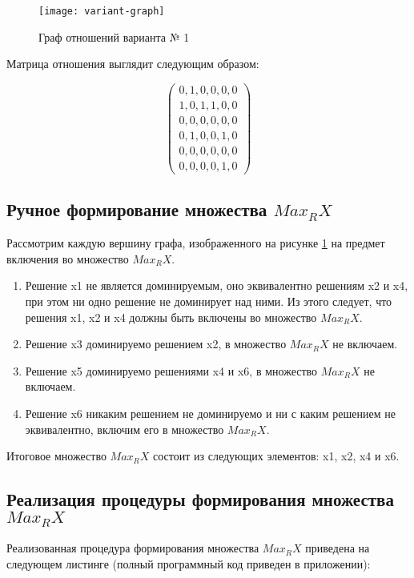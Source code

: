 \documentclass[a4paper,14pt]{extarticle}
\begin{document}
\begin{figure}[H]
    \centering
    \texttt{[image: variant-graph]}
    \caption{Граф отношений варианта № 1}
    \label{fig:variant-graph}
\end{figure}

Матрица отношения выглядит следующим образом:

$$\begin{pmatrix}
    0, 1, 0, 0, 0, 0 \\
    1, 0, 1, 1, 0, 0 \\
    0, 0, 0, 0, 0, 0 \\
    0, 1, 0, 0, 1, 0 \\
    0, 0, 0, 0, 0, 0 \\
    0, 0, 0, 0, 1, 0
\end{pmatrix}$$

\subsection{Ручное формирование множества $Max_R X$}
Рассмотрим каждую вершину графа, изображенного на рисунке
\ref{fig:variant-graph} на предмет включения во множество $Max_R X$.

\begin{enumerate}
    \item Решение x1 не является доминируемым, оно эквивалентно решениям x2 и
          x4, при этом ни одно решение не доминирует над ними. Из этого следует,
          что решения x1, x2 и x4 должны быть включены во множество $Max_R X$.

    \item Решение x3 доминируемо решением x2, в множество $Max_R X$ не включаем.
    
    \item Решение x5 доминируемо решениями x4 и x6, в множество $Max_R X$ не
          включаем.

    \item Решение x6 никаким решением не доминируемо и ни с каким решением не
    эквивалентно, включим его в множество $Max_R X$.
\end{enumerate}

Итоговое множество $Max_R X$ состоит из следующих элементов: x1, x2, x4 и x6.

\subsection{Реализация процедуры формирования множества $Max_R X$}
Реализованная процедура формирования множества $Max_R X$ приведена на следующем
листинге (полный программный код приведен в приложении):
\end{document}
